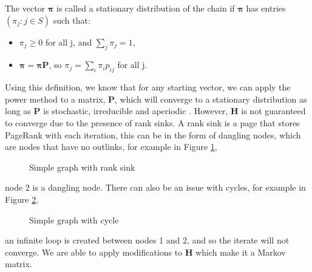 \documentclass[11pt]{report}
\begin{document}
The vector $\boldsymbol\pi$ is called a stationary distribution of the chain if $\boldsymbol\pi$ has entries $(\pi_j : j \in S)$ such that:
\begin{itemize}
\item $\pi_j \geq 0$ for all j, and $\sum_j \pi_j = 1$,
\item $\boldsymbol\pi = \boldsymbol\pi\textbf{P}$, so $\pi_j = \sum_i \pi_ip_{ij}$ for all j.
\end{itemize} Using this definition, we know that for any starting vector, we can apply the power method to a matrix, \textbf{P},  which will converge to a stationary distribution as long as \textbf{P} is stochastic, irreducible and aperiodic \cite{grimmett2001probability}. However, \textbf{H} is not guaranteed to converge due to the presence of rank sinks. A rank sink is a page that stores PageRank with each iteration, this can be in the form of dangling nodes, which are nodes that have no outlinks, for example in Figure \ref{fig:dangling},\begin{figure}[h]
\centering
{} \caption{Simple graph with rank sink} \label{fig:dangling} \end{figure} node 2 is a dangling node. There can also be an issue with cycles, for example in Figure \ref{fig:cycle}, 
\begin{figure}[h]
\centering
{} \caption{Simple graph with cycle} \label{fig:cycle}
\end{figure} an infinite loop is created between nodes 1 and 2, and so the iterate will not converge. We are able to apply modifications to \textbf{H} which make it a Markov matrix.
\end{document}
